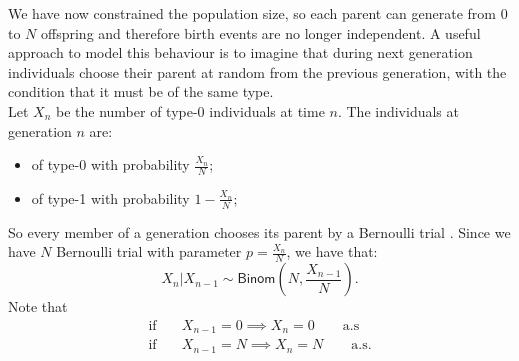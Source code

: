 \documentclass{article}
\begin{document}
We have now constrained the population size, so each parent can generate from 0 to $N$ offspring and therefore birth events are no longer independent. A useful approach to model this behaviour is to imagine that during next generation individuals choose their parent at random from the previous generation, with the condition that it must be of the same type.\\
Let $X_n$ be the number of type-0 individuals at time $n$. The individuals at generation $n$ are:
\begin{itemize}
    \item of type-0 with probability $\frac{X_n}{N}$;
    \item of type-1 with probability $1-\frac{X_n}{N}$;
\end{itemize}
So every member of a generation chooses its parent by a Bernoulli trial . Since we have $N$ Bernoulli trial with parameter $p=\frac{X_n}{N}$, we have that:
\[
X_n|X_{n-1}\sim \mathsf{Binom}\left(N,\frac{X_{n-1}}{N}\right).
\]
Note that 
\begin{align*}
    \text{if}\quad &X_{n-1}=0 \implies X_n=0\qquad\text{a.s}\\
    \text{if}\quad &X_{n-1}=N \implies X_n=N\qquad\text{a.s}.
\end{align*}
\end{document}
